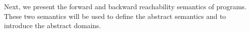 Next, we present the forward and backward reachability semantics of programs.
These two semantics will be used to define the abstract semantics and to introduce the abstract domains.

